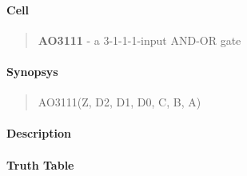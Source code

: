 \label{AO3111}
\paragraph{Cell}
\begin{quote}
    \textbf{AO3111} - a 3-1-1-1-input AND-OR gate
\end{quote}

\paragraph{Synopsys}
\begin{quote}
    AO3111(Z, D2, D1, D0, C, B, A)
\end{quote}

\paragraph{Description}

%

\paragraph{Truth Table}


